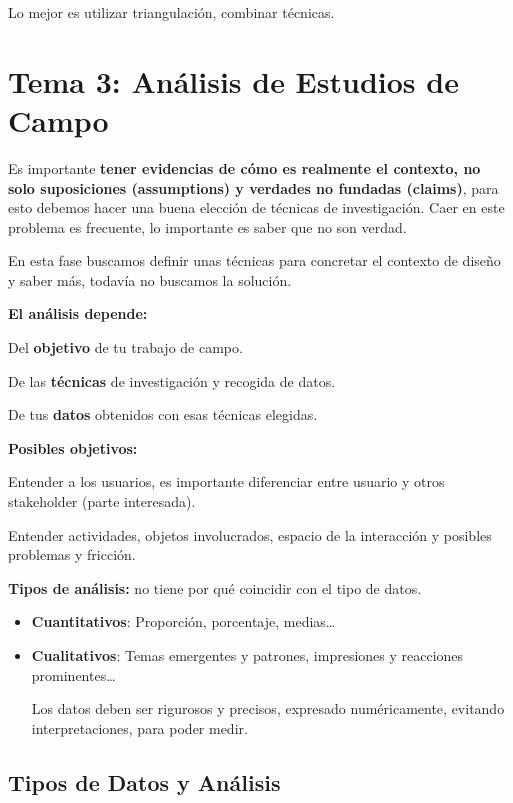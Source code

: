 \documentclass[12pt]{report} %
\begin{document}
\hspace{0pt} Lo mejor es utilizar triangulación, combinar técnicas.

\chapter{Tema 3: Análisis de Estudios de
Campo}

Es importante \textbf{tener evidencias de cómo es realmente el contexto,
no solo suposiciones (assumptions) y verdades no fundadas (claims)},
para esto debemos hacer una buena elección de técnicas de investigación.
Caer en este problema es frecuente, lo importante es saber que no son
verdad.

En esta fase buscamos definir unas técnicas para concretar el contexto
de diseño y saber más, todavía no buscamos la solución.

\textbf{El análisis depende:}

Del \textbf{objetivo} de tu trabajo de campo.

De las \textbf{técnicas} de investigación y recogida de datos.

De tus \textbf{datos} obtenidos con esas técnicas elegidas.

\textbf{Posibles objetivos:}

Entender a los usuarios, es importante diferenciar entre usuario y otros
stakeholder (parte interesada).

Entender actividades, objetos involucrados, espacio de la interacción y
posibles problemas y fricción.

\textbf{Tipos de análisis:} no tiene por qué coincidir con el tipo de
datos.

\begin{itemize}
\item
  \textbf{Cuantitativos}: Proporción, porcentaje, medias\ldots{}
\item
  \textbf{Cualitativos}: Temas emergentes y patrones, impresiones y
  reacciones prominentes\ldots{}

  Los datos deben ser rigurosos y precisos, expresado numéricamente,
  evitando interpretaciones, para poder medir.
\end{itemize}

\section{Tipos de Datos y
Análisis}
\end{document}
